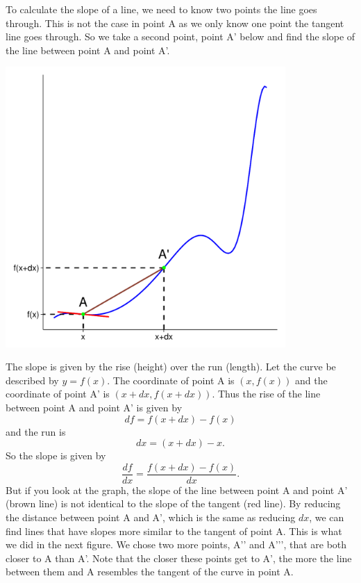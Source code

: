 \documentclass[a4paper]{report}
\begin{document}
To calculate the slope of a line, we need to know two points the line goes through. This is not the case in point A as we only know one point the tangent line goes through. So we take a second point, point A\textquoteright \; below and find the slope of the line between point A and point A\textquoteright.\\ 
\begin{center}
\includegraphics[width=0.8\textwidth]{der_graph3.pdf}
\end{center}
The slope is given by the rise (height) over the run (length). Let the curve be described by $y=f(x)$. The coordinate of point A is $(x, f(x))$ and the coordinate of point A\textquoteright \; is $(x+dx, f(x+dx))$. Thus the rise of the line between point A and point A\textquoteright \; is given by 
\begin{equation}
df=f(x+dx)-f(x)
\end{equation}
and the run is
\begin{equation}
dx=(x+dx)-x.
\end{equation}
So the slope is given by 
\begin{equation}
\frac{df}{dx}=\frac{f(x+dx)-f(x)}{dx}.
\end{equation}
But if you look at the graph, the slope of the line between point A and point A\textquoteright \; (brown line) is not identical to the slope of the tangent (red line). By reducing the distance between point A and A\textquoteright, which is the same as reducing $dx$, we can find lines that have slopes more similar to the tangent of point A. This is what we did in the next figure. We chose two more points, A\textquoteright\textquoteright \; and A\textquoteright \textquoteright\textquoteright \;, that are both closer to A than A\textquoteright \;. Note that the closer these points get to A\textquoteright\;, the more the line between them and A resembles the tangent of the curve in point A.\\
\end{document}
